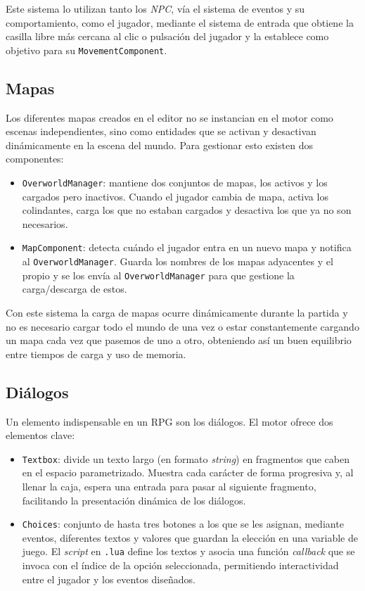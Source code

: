 Este sistema lo utilizan tanto los \textit{NPC}, vía el sistema de eventos y su comportamiento, como el jugador, mediante el sistema de entrada que obtiene la casilla libre más cercana al clic o pulsación del jugador y la establece como objetivo para su \texttt{MovementComponent}. 

\subsection{Mapas}
Los diferentes mapas creados en el editor no se instancian en el motor como escenas independientes, sino como entidades que se activan y desactivan dinámicamente en la escena del mundo. Para gestionar esto existen dos componentes:

\begin{itemize}
	\item \texttt{OverworldManager}: mantiene dos conjuntos de mapas, los activos y los cargados pero inactivos. Cuando el jugador cambia de mapa, activa los colindantes, carga los que no estaban cargados y desactiva los que ya no son necesarios.
	\item \texttt{MapComponent}: detecta cuándo el jugador entra en un nuevo mapa y notifica al \texttt{OverworldManager}. Guarda los nombres de los mapas adyacentes y el propio y se los envía al \texttt{OverworldManager} para que gestione la carga/descarga de estos.
\end{itemize}

Con este sistema la carga de mapas ocurre dinámicamente durante la partida y no es necesario cargar todo el mundo de una vez o estar constantemente cargando un mapa cada vez que pasemos de uno a otro, obteniendo así un buen equilibrio entre tiempos de carga y uso de memoria. 

\subsection{Diálogos}
Un elemento indispensable en un RPG son los diálogos. El motor ofrece dos elementos clave: 

\begin{itemize}
	\item \texttt{Textbox}: divide un texto largo (en formato \textit{string}) en fragmentos que caben en el espacio parametrizado. Muestra cada carácter de forma progresiva y, al llenar la caja, espera una entrada para pasar al siguiente fragmento, facilitando la presentación dinámica de los diálogos. 
	\item \texttt{Choices}: conjunto de hasta tres botones a los que se les asignan, mediante eventos, diferentes textos y valores que guardan la elección en una variable de juego. El \textit{script} en \texttt{.lua} define los textos y asocia una función \textit{callback} que se invoca con el índice de la opción seleccionada, permitiendo interactividad entre el jugador y los eventos diseñados.
\end{itemize}

